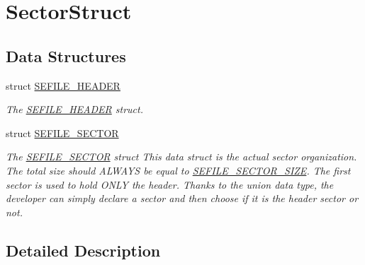 \hypertarget{group___sector_struct}{\section{Sector\-Struct}
\label{group___sector_struct}
}
\subsection*{Data Structures}
\begin{DoxyCompactItemize}
\item 
struct \hyperlink{struct_s_e_f_i_l_e___h_e_a_d_e_r}{S\-E\-F\-I\-L\-E\-\_\-\-H\-E\-A\-D\-E\-R}
\begin{DoxyCompactList}\small\item\em The \hyperlink{struct_s_e_f_i_l_e___h_e_a_d_e_r}{S\-E\-F\-I\-L\-E\-\_\-\-H\-E\-A\-D\-E\-R} struct. \end{DoxyCompactList}\item 
struct \hyperlink{struct_s_e_f_i_l_e___s_e_c_t_o_r}{S\-E\-F\-I\-L\-E\-\_\-\-S\-E\-C\-T\-O\-R}
\begin{DoxyCompactList}\small\item\em The \hyperlink{struct_s_e_f_i_l_e___s_e_c_t_o_r}{S\-E\-F\-I\-L\-E\-\_\-\-S\-E\-C\-T\-O\-R} struct This data struct is the actual sector organization. The total size should A\-L\-W\-A\-Y\-S be equal to \hyperlink{group___sector___defines_gad205a758c315675de3ad9f5f1cbf962d}{S\-E\-F\-I\-L\-E\-\_\-\-S\-E\-C\-T\-O\-R\-\_\-\-S\-I\-Z\-E}. The first sector is used to hold O\-N\-L\-Y the header. Thanks to the union data type, the developer can simply declare a sector and then choose if it is the header sector or not. \end{DoxyCompactList}\end{DoxyCompactItemize}


\subsection{Detailed Description}
